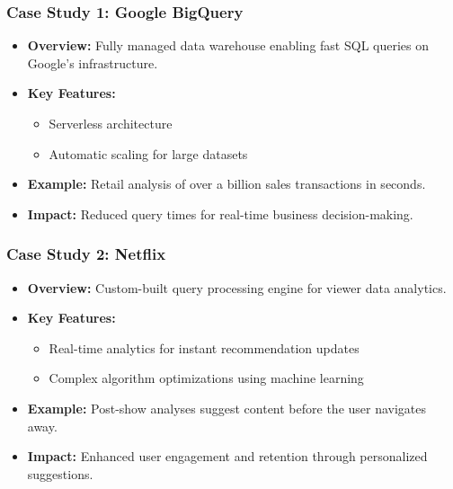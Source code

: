 \documentclass[aspectratio=169]{beamer}
\begin{document}
\begin{frame}
    \frametitle{Case Study 1: Google BigQuery}
    \begin{itemize}
        \item \textbf{Overview:} Fully managed data warehouse enabling fast SQL queries on Google’s infrastructure.
        \item \textbf{Key Features:}
        \begin{itemize}
            \item Serverless architecture
            \item Automatic scaling for large datasets
        \end{itemize}
        \item \textbf{Example:} Retail analysis of over a billion sales transactions in seconds.
        \item \textbf{Impact:} Reduced query times for real-time business decision-making.
    \end{itemize}
\end{frame}

\begin{frame}
    \frametitle{Case Study 2: Netflix}
    \begin{itemize}
        \item \textbf{Overview:} Custom-built query processing engine for viewer data analytics.
        \item \textbf{Key Features:}
        \begin{itemize}
            \item Real-time analytics for instant recommendation updates
            \item Complex algorithm optimizations using machine learning
        \end{itemize}
        \item \textbf{Example:} Post-show analyses suggest content before the user navigates away.
        \item \textbf{Impact:} Enhanced user engagement and retention through personalized suggestions.
    \end{itemize}
\end{frame}
\end{document}
